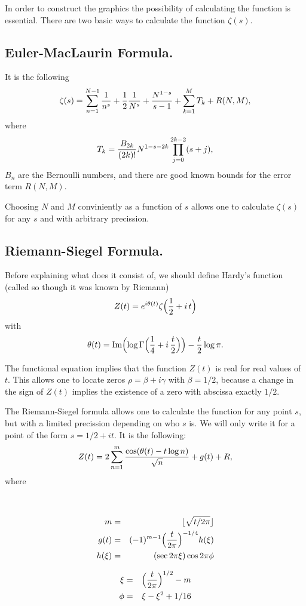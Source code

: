 \documentclass[a4paper]{amsart}
\numberwithin{equation}{section}
\def\Im{\operatorname{\text{Im}}}
\begin{document}
\begin{large}
In order to construct the graphics the possibility of calculating the function is
essential. There are two basic ways to calculate the function $\zeta(s)$.



\subsection{Euler-MacLaurin Formula.}
It is the following 
$$
\zeta(s)=\sum_{n=1}^{N-1}{1\over n^s}+{1\over2}{1\over N^s}+{N^{1-s}\over
s-1}
+
\sum_{k=1}^M T_k+R(N,M),$$
where
$$T_k={B_{2k}\over(2k)!}N^{1-s-2k}\prod_{j=0}^{2k-2}(s+j),$$
$B_n$ are the Bernoulli numbers, and there are good known bounds for the
error term $R(N, M)$.

Choosing $N$ and $M$ conviniently as a function of $s$ allows one to calculate
$\zeta(s)$ for any $s$ and with arbitrary precission.


\subsection{Riemann-Siegel Formula.}
Before explaining what does it consist of, we
should define Hardy's function (called so though it was known by Riemann)
$$Z(t)=e^{i\theta(t)}\zeta\Bigl({1\over2}+i\,t\Bigr)$$
with
$$\theta(t)=\Im\Bigl(\log\Gamma\Bigl({1\over4}+ i\, {t\over2}\Bigr)\Bigr)-{t\over 2}\log
\pi.$$

The functional equation implies that the function $Z(t)$ is real
for real values of $t$. This allows one to locate zeros
$\rho=\beta + i\gamma$ with $\beta=1/2$, because a change in the
sign of $Z(t)$ implies the existence of a zero with abscissa
exactly $1/2$.


The Riemann-Siegel formula allows one to calculate the function for any point
$s$, but with a limited precission depending on who $s$ is. We will only write
it for a point of the form $s=1/2 + it$. It is the following:
$$Z(t)=2\sum_{n=1}^m{\cos(\theta(t)-t\log n)\over \sqrt{n}}+g(t)+R,$$
where

\noindent
\begin{minipage}{3cm}\ \hskip1cm
\parbox{3cm}{\begin{eqnarray}
m&=&\lfloor\sqrt{t/2\pi}\rfloor\nonumber\\
g(t)&=&(-1)^{m-1}\Bigl({t\over2\pi}\Bigr)^{-1/4}h(\xi)\nonumber\\
h(\xi)&=&(\sec 2\pi \xi)\cos 2\pi\phi\nonumber
\end{eqnarray}}
\end{minipage}
\hfill
\begin{minipage}{3cm}
\parbox{3cm}{\begin{eqnarray}
\xi&=&\Bigl({t\over 2\pi}\Bigr)^{1/2}-m\nonumber\\
\phi&=&\xi-\xi^2+1/16\nonumber\end{eqnarray}
}\hskip1cm\ \end{minipage}
\goodbreak
\bigskip


\end{large}
\end{document}
